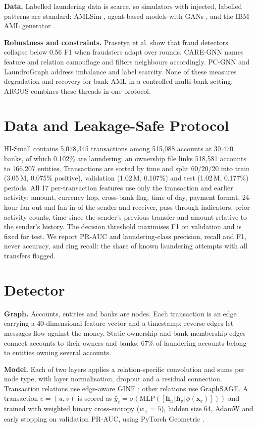 \documentclass[conference]{IEEEtran}
\begin{document}
\textbf{Data.} Labelled laundering data is scarce, so simulators with injected, labelled patterns are standard: AMLSim \cite{weber2018scalable}, agent-based models with GANs \cite{granados2024gan}, and the IBM AML generator \cite{altman2023realistic}.

\textbf{Robustness and constraints.} Prasetya et al. \cite{prasetya2025multi} show that fraud detectors collapse below 0.56 F1 when fraudsters adapt over rounds. CARE-GNN \cite{dou2020enhancing} names feature and relation camouflage and filters neighbours accordingly. PC-GNN \cite{liu2021pick} and LaundroGraph \cite{cardoso2022laundrograph} address imbalance and label scarcity. None of these measures degradation and recovery for bank AML in a controlled multi-bank setting; ARGUS combines these threads in one protocol.

\section{Data and Leakage-Safe Protocol}
HI-Small contains 5,078,345 transactions among 515,088 accounts at 30,470 banks, of which 0.102\% are laundering; an ownership file links 518,581 accounts to 166,207 entities. Transactions are sorted by time and split 60/20/20 into train (3.05\,M, 0.075\% positive), validation (1.02\,M, 0.107\%) and test (1.02\,M, 0.177\%) periods. All 17 per-transaction features use only the transaction and earlier activity: amount, currency hop, cross-bank flag, time of day, payment format, 24-hour fan-out and fan-in of the sender and receiver, pass-through indicators, prior activity counts, time since the sender's previous transfer and amount relative to the sender's history. The decision threshold maximises F1 on validation and is fixed for test. We report PR-AUC and laundering-class precision, recall and F1, never accuracy, and ring recall: the share of known laundering attempts with all transfers flagged.

\section{Detector}
\textbf{Graph.} Accounts, entities and banks are nodes. Each transaction is an edge carrying a 40-dimensional feature vector and a timestamp; reverse edges let messages flow against the money. Static ownership and bank-membership edges connect accounts to their owners and banks; 67\% of laundering accounts belong to entities owning several accounts.

\textbf{Model.} Each of two layers applies a relation-specific convolution and sums per node type, with layer normalisation, dropout and a residual connection. Transaction relations use edge-aware GINE \cite{hu2020strategies}; other relations use GraphSAGE. A transaction $e=(u,v)$ is scored as $\hat{y}_e=\sigma(\mathrm{MLP}([\mathbf{h}_u \Vert \mathbf{h}_v \Vert \phi(\mathbf{x}_e)]))$ and trained with weighted binary cross-entropy ($w_+=5$), hidden size 64, AdamW and early stopping on validation PR-AUC, using PyTorch Geometric \cite{fey2019fast}.
\end{document}
